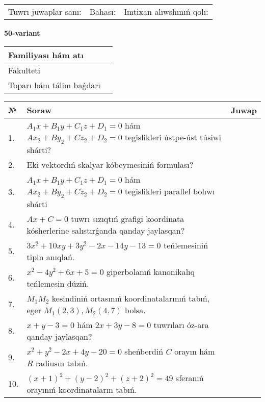 \documentclass{article}
\begin{document}
\vspace{1cm}

\begin{tabular}{lll}
Tuwrı juwaplar sanı: \underline{\hspace{1.5cm}} & 
Bahası: \underline{\hspace{1.5cm}} & 
Imtixan alıwshınıń qolı: \underline{\hspace{2cm}} \\
\end{tabular}

\egroup

\newpage


\textbf{50-variant}\\

\bgroup
\def\arraystretch{1.6} %

\begin{tabular}{|m{5.7cm}|m{9.5cm}|}
\hline
Familiyası hám atı & \\
\hline
Fakulteti  & \\
\hline
Toparı hám tálim baǵdarı  & \\
\hline
\end{tabular}

\vspace{1cm}

\begin{tabular}{|m{0.7cm}|m{10cm}|m{4cm}|}
\hline
№ & Soraw & Juwap \\
\hline
1. & $A_1x+B_1y+C_1z+D_1=0$ hám $Ax_2+By_2+Cz_2+D_2=0$ tegislikleri ústpe-úst túsiwi shárti? &  \\
\hline
2. & Eki vektordıń skalyar kóbeymesiniń formulası? &  \\
\hline
3. & $A_1x+B_1y+C_1z+D_1=0$ hám $Ax_2+By_2+Cz_2+D_2=0$ tegislikleri parallel bolıwı shárti &  \\
\hline
4. & $Ax+C=0$ tuwrı sızıqtıń grafigi koordinata kósherlerine salıstırǵanda qanday jaylasqan? &  \\
\hline
5. & $3x^{2}+10xy+3y^{2}-2x-14y-13=0$ teńlemesiniń tipin anıqlań. &  \\
\hline
6. & $x^{2}-4y^{2}+6x+5=0$ giperbolanıń kanonikalıq teńlemesin dúziń. &  \\
\hline
7. & $M_{1}M_{2}$ kesindiniń ortasınıń koordinatalarınıń tabıń, eger $M_{1} (2, 3), M_{2} (4, 7)$ bolsa. &  \\
\hline
8. & $x+y-3=0$ hám $2x+3y-8=0$ tuwrıları óz-ara qanday jaylasqan? &  \\
\hline
9. & $x^{2}+y^{2}-2x+4y-20=0$ sheńberdiń $C$ orayın hám $R$ radiusın tabıń. &  \\
\hline
10. & $(x+1)^{2}+(y-2) ^{2}+(z+2) ^{2}=49$ sferanıń orayınıń koordinataların tabıń. &  \\
\hline
\end{tabular}
\end{document}
